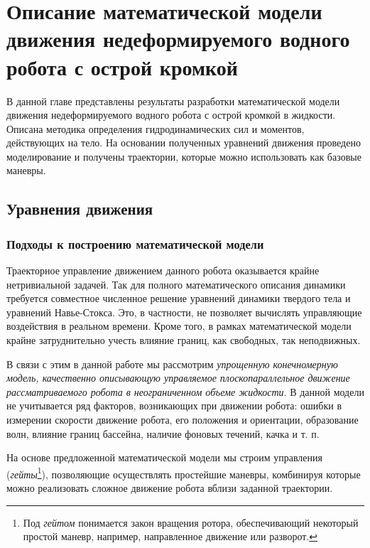 \chapter{Описание математической модели движения недеформируемого водного робота с острой кромкой}\label{ch:ch6}

В данной главе представлены результаты разработки математической модели движения недеформируемого водного робота с острой кромкой в жидкости. Описана методика определения гидродинамических сил и моментов, действующих на тело. На основании полученных уравнений движения проведено моделирование и получены траектории, которые можно использовать как  базовые маневры.

\section{Уравнения движения}

\subsection{Подходы к построению математической модели}



Траекторное управление движением данного робота оказывается крайне нетривиальной задачей. Так для полного математического описания динамики требуется совместное численное решение уравнений динамики твердого тела и уравнений Навье-Стокса. Это, в частности, не позволяет вычислять управляющие воздействия в реальном времени. Кроме того, в рамках математической модели крайне затруднительно учесть влияние границ, как свободных, так неподвижных.

В связи с этим в данной работе мы рассмотрим \textit{упрощенную конечномерную модель, качественно описывающую управляемое плоскопараллельное движение рассматриваемого робота в неограниченном объеме жидкости}. В данной модели не учитывается ряд факторов, возникающих при движении робота: ошибки в измерении скорости движение робота, его положения и ориентации, образование волн, влияние границ бассейна, наличие фоновых течений, качка и т. п.

На основе предложенной математической модели мы строим управления (\textit{гейты}\footnote{Под \textit{гейтом}  понимается закон вращения ротора, обеспечивающий некоторый простой маневр, например, направленное движение или разворот.}), позволяющие осуществлять простейшие маневры, комбинируя которые можно реализовать сложное движение робота вблизи заданной траектории. %

